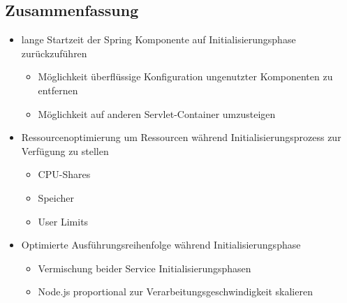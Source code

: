 \subsection{Zusammenfassung}


\begin{itemize}
	\item lange Startzeit der Spring Komponente auf Initialisierungsphase zurückzuführen
	\begin{itemize}
		\item Möglichkeit überflüssige Konfiguration ungenutzter Komponenten zu entfernen
		\item Möglichkeit auf anderen Servlet-Container umzusteigen
	\end{itemize}
	\item Ressourcenoptimierung um Ressourcen während Initialisierungsprozess zur Verfügung zu stellen
	\begin{itemize}
		\item CPU-Shares
		\item Speicher
		\item User Limits
	\end{itemize}
	\item Optimierte Ausführungsreihenfolge während Initialisierungsphase
	\begin{itemize}
		\item Vermischung beider Service Initialisierungsphasen
		\item Node.js proportional zur Verarbeitungsgeschwindigkeit skalieren
	\end{itemize}
\end{itemize}


